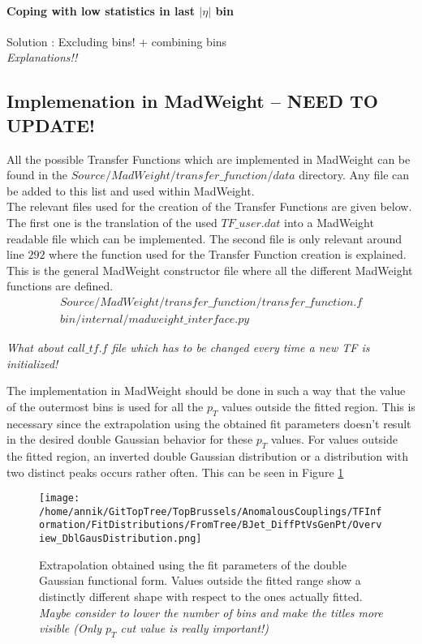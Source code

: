 \paragraph{Coping with low statistics in last $\vert \eta \vert$ bin\\}
Solution : Excluding bins! + combining bins\\
\textit{Explanations!!}

\subsection{Implemenation in MadWeight -- NEED TO UPDATE!}
All the possible Transfer Functions which are implemented in MadWeight can be found in the $Source/MadWeight/transfer\_function/data$ directory. Any file can be added to this list and used within MadWeight.\\
The relevant files used for the creation of the Transfer Functions are given below. The first one is the translation of the used $TF\_user.dat$ into a MadWeight readable file which can be implemented. The second file is only relevant around line $292$ where the function used for the Transfer Function creation is explained. This is the general MadWeight constructor file where all the different MadWeight functions are defined.
\begin{eqnarray} 
 Source/MadWeight/transfer\_function/transfer\_function.f \nonumber \\
 bin/internal/madweight\_interface.py \nonumber
\end{eqnarray}

\textit{What about $call\_tf.f$ file which has to be changed every time a new TF is initialized!}

The implementation in MadWeight should be done in such a way that the value of the outermost bins is used for all the $p_T$ values outside the fitted region. This is necessary since the extrapolation using the obtained fit parameters doesn't result in the desired double Gaussian behavior for these $p_T$ values. For values outside the fitted region, an inverted double Gaussian distribution or a distribution with two distinct peaks occurs rather often. This can be seen in Figure \ref{fig::doubleGaussExtrap}
\begin{figure}[!h]
  \centering
  \texttt{[image: /home/annik/GitTopTree/TopBrussels/AnomalousCouplings/TFInformation/FitDistributions/FromTree/BJet\_DiffPtVsGenPt/Overview\_DblGausDistribution.png]}
  \caption{Extrapolation obtained using the fit parameters of the double Gaussian functional form. Values outside the fitted range show a distinctly different shape with respect to the ones actually fitted. \textit{Maybe consider to lower the number of bins and make the titles more visible (Only $p_T$ cut value is really important!)}} \label{fig::doubleGaussExtrap} 
\end{figure}

